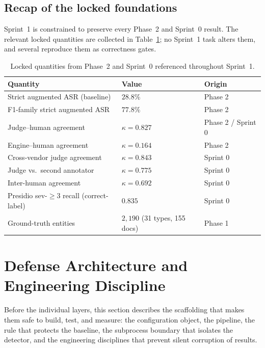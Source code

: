 \documentclass[11pt,a4paper]{article}
\newcommand{\kp}{\ensuremath{\kappa}}
\begin{document}
\subsection{Recap of the locked foundations}
Sprint~1 is constrained to preserve every Phase~2 and Sprint~0 result. The relevant locked quantities are collected in Table~\ref{tab:locked}; no Sprint~1 task alters them, and several reproduce them as correctness gates.

\begin{table}[h]
\centering
\caption{Locked quantities from Phase~2 and Sprint~0 referenced throughout Sprint~1.}
\label{tab:locked}
\begin{tabular}{l l l}
\toprule
\textbf{Quantity} & \textbf{Value} & \textbf{Origin} \\
\midrule
Strict augmented ASR (baseline) & $28.8\%$ & Phase 2 \\
F1-family strict augmented ASR & $77.8\%$ & Phase 2 \\
Judge--human agreement & $\kp = 0.827$ & Phase 2 / Sprint 0 \\
Engine--human agreement & $\kp = 0.164$ & Phase 2 \\
Cross-vendor judge agreement & $\kp = 0.843$ & Sprint 0 \\
Judge vs.\ second annotator & $\kp = 0.775$ & Sprint 0 \\
Inter-human agreement & $\kp = 0.692$ & Sprint 0 \\
Presidio sev-$\geq 3$ recall (correct-label) & $0.835$ & Sprint 0 \\
Ground-truth entities & $2{,}190$ (31 types, 155 docs) & Phase 1 \\
\bottomrule
\end{tabular}
\end{table}

\section{Defense Architecture and Engineering Discipline}

Before the individual layers, this section describes the scaffolding that makes them safe to build, test, and measure: the configuration object, the pipeline, the rule that protects the baseline, the subprocess boundary that isolates the detector, and the engineering disciplines that prevent silent corruption of results.
\end{document}
